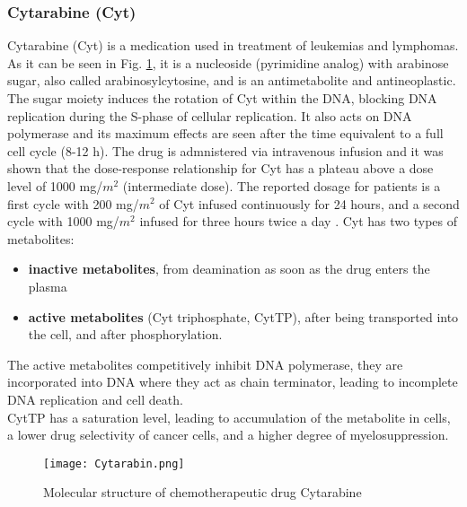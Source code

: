 \subsubsection{Cytarabine (Cyt)}
Cytarabine (Cyt) is a medication used in treatment of leukemias and lymphomas. As it can be seen in Fig. \ref{fig:Cyt}, it is a nucleoside (pyrimidine analog) with arabinose sugar, also called arabinosylcytosine, and is an antimetabolite and antineoplastic.
The sugar moiety induces the rotation of Cyt within the DNA, blocking DNA replication during the S-phase of cellular replication. It also acts on DNA polymerase and its maximum effects are seen after the time equivalent to a full cell cycle (8-12 h). 
The drug is admnistered via intravenous infusion and it was shown that the dose-response relationship for Cyt has a plateau above a dose level of 1000 mg/$m^2$ (intermediate dose). The reported dosage for patients is a first cycle with 200 mg/$m^2$ of Cyt infused continuously for 24 hours, and a second cycle with 1000 mg/$m^2$ infused for three hours twice a day \cite{cyt-3}.
Cyt has two types of metabolites: 
\begin{itemize}
	\item \textbf{inactive metabolites}, from deamination as soon as the drug enters the plasma
	\item \textbf{active metabolites} (Cyt triphosphate, CytTP), after being transported into the cell, and after phosphorylation.
\end{itemize}
The active metabolites competitively inhibit DNA polymerase, they are incorporated into DNA where they act as chain terminator, leading to incomplete DNA replication and cell death.\\
CytTP has a saturation level, leading to accumulation of the metabolite in cells, a lower drug selectivity of cancer cells, and a higher degree of myelosuppression.\cite{cyt-1, cyt-2}
\begin{figure}[htbp!]
	\centering
	\texttt{[image: Cytarabin.png]}
	\caption{Molecular structure of chemotherapeutic drug Cytarabine}
	\label{fig:Cyt}
\end{figure}

